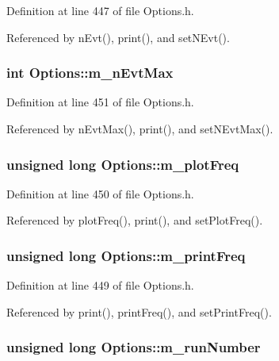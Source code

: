 Definition at line 447 of file Options.h.

Referenced by nEvt(), print(), and setNEvt().\hypertarget{classOptions_a825a47258257937a8caa902f5fff7e8a}{
\subsubsection[{m\_\-nEvtMax}]{\setlength{\rightskip}{0pt plus 5cm}int {\bf Options::m\_\-nEvtMax}}}
\label{classOptions_a825a47258257937a8caa902f5fff7e8a}


Definition at line 451 of file Options.h.

Referenced by nEvtMax(), print(), and setNEvtMax().\hypertarget{classOptions_aa7f7161bc67732b310937afb137657a0}{
\subsubsection[{m\_\-plotFreq}]{\setlength{\rightskip}{0pt plus 5cm}unsigned long {\bf Options::m\_\-plotFreq}}}
\label{classOptions_aa7f7161bc67732b310937afb137657a0}


Definition at line 450 of file Options.h.

Referenced by plotFreq(), print(), and setPlotFreq().\hypertarget{classOptions_acf8f96cbc3245ec4b3b47bd3bfa0d742}{
\subsubsection[{m\_\-printFreq}]{\setlength{\rightskip}{0pt plus 5cm}unsigned long {\bf Options::m\_\-printFreq}}}
\label{classOptions_acf8f96cbc3245ec4b3b47bd3bfa0d742}


Definition at line 449 of file Options.h.

Referenced by print(), printFreq(), and setPrintFreq().\hypertarget{classOptions_a1762c644c5f87feabe12f84f17a1a351}{
\subsubsection[{m\_\-runNumber}]{\setlength{\rightskip}{0pt plus 5cm}unsigned long {\bf Options::m\_\-runNumber}}}
\label{classOptions_a1762c644c5f87feabe12f84f17a1a351}


